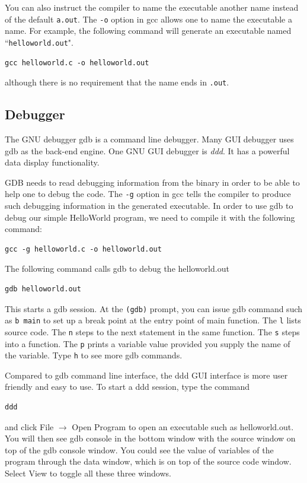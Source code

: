 You can also instruct the compiler to name the executable another name instead of the default \verb+a.out+. The \verb+-o+ option in gcc allows one to name the executable a name. For example, the following command will generate an executable named ``\verb+helloworld.out+".
\begin{lstlisting}[style=bash]
gcc helloworld.c -o helloworld.out
\end{lstlisting}
although there is no requirement that the name ends in \verb+.out+.
\subsection{Debugger}
The GNU debugger gdb is a command line debugger. Many GUI debugger uses gdb as the back-end engine. One GNU GUI debugger is {\em ddd}. It has a powerful data display functionality. 

GDB needs to read debugging information from the binary in order to be able to help one to debug the code. The \verb+-g+ option in gcc tells the compiler to produce such debugging information in the generated executable. In order to use gdb to debug our simple HelloWorld program, we need to compile it with the following command:
\begin{lstlisting}[style=bash]
gcc -g helloworld.c -o helloworld.out
\end{lstlisting}

The following command calls gdb to debug the helloworld.out 
\begin{lstlisting}[style=bash]
gdb helloworld.out 
\end{lstlisting}
This starts a gdb session. At the \verb+(gdb)+ prompt, you can issue gdb command such as \verb+b main+ to set up a break point at the entry point of main function. The \verb+l+ lists source code. The \verb+n+ steps to the next statement in the same function. The \verb+s+ steps into a function. The \verb+p+ prints a variable value provided you supply the name of the variable. Type \verb+h+ to see more gdb commands.

Compared to gdb command line interface, the ddd GUI interface is more user friendly and easy to use. To start a ddd session,
type the command
\begin{lstlisting}[style=bash]
ddd 
\end{lstlisting}
and click File $\rightarrow$ Open Program to open an executable such as helloworld.out. You will then see gdb console in the bottom window with the source window on top of the gdb console window. You could see the value of variables of the program through the data window, which is on top of the source code window. Select View to toggle all these three windows. 

